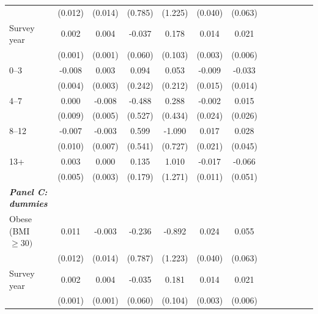 \documentclass[12pt,english]{article}
\begin{document}
\begin{table}[!ht]
\begin{center}
\begin{adjustbox}{max width=.9\linewidth}
\begin{threeparttable}
{\begin{tabular}{l*{6}{S S}}
						&  (0.012)         &  (0.014)         &  (0.785)         &  (1.225)         &  (0.040)         &  (0.063)         \\
						Survey year     &    0.002\sym{**} &    0.004\sym{***}&   -0.037         &    0.178\sym{*}  &    0.014\sym{***}&    0.021\sym{***}\\
						&  (0.001)         &  (0.001)         &  (0.060)         &  (0.103)         &  (0.003)         &  (0.006)         \\
						0--3 &   -0.008\sym{*}  &    0.003         &    0.094         &    0.053         &   -0.009         &   -0.033\sym{**} \\
						&  (0.004)         &  (0.003)         &  (0.242)         &  (0.212)         &  (0.015)         &  (0.014)         \\
						4--7 &    0.000         &   -0.008         &   -0.488         &    0.288         &   -0.002         &    0.015         \\
						&  (0.009)         &  (0.005)         &  (0.527)         &  (0.434)         &  (0.024)         &  (0.026)         \\
						8--12 &   -0.007         &   -0.003         &    0.599         &   -1.090         &    0.017         &    0.028         \\
						&  (0.010)         &  (0.007)         &  (0.541)         &  (0.727)         &  (0.021)         &  (0.045)         \\
						13+ &    0.003         &    0.000         &    0.135         &    1.010         &   -0.017         &   -0.066         \\
						&  (0.005)         &  (0.003)         &  (0.179)         &  (1.271)         &  (0.011)         &  (0.051)         \\
						\textit{\textbf{Panel C: dummies}} &&&&&&\\
						Obese (BMI $\geq 30)$&    0.011         &   -0.003         &   -0.236         &   -0.892         &    0.024         &    0.055         \\
						&  (0.012)         &  (0.014)         &  (0.787)         &  (1.223)         &  (0.040)         &  (0.063)         \\
						Survey year     &    0.002\sym{**} &    0.004\sym{***}&   -0.035         &    0.181\sym{*}  &    0.014\sym{***}&    0.021\sym{***}\\
						&  (0.001)         &  (0.001)         &  (0.060)         &  (0.104)         &  (0.003)         &  (0.006)         \\

\end{tabular}}
\end{threeparttable}
\end{adjustbox}
\end{center}
\end{table}
\end{document}
